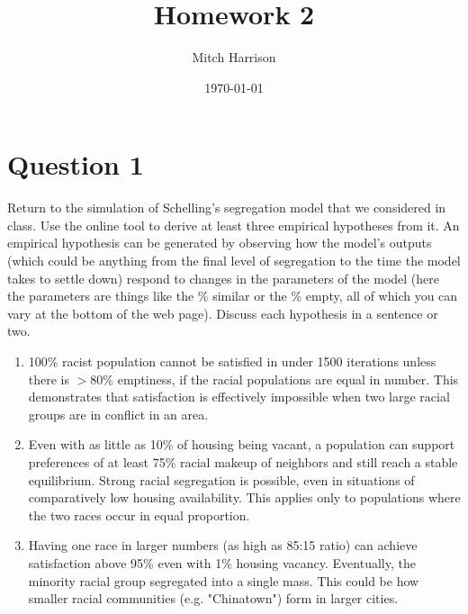 \documentclass[titlepage, 12pt, leqno]{article}
\title{\Huge{Homework 2}}
\author{\large{Mitch Harrison}}
\date{\today}
\begin{document}
\setlength{\parskip}{1\baselineskip}
\setlength{\parindent}{15pt}
\maketitle
\newpage


\section{Question 1}

\begin{ex}
    Return to the simulation of Schelling’s segregation model that we considered 
    in class. Use the online tool to derive at least three empirical hypotheses 
    from it. An empirical hypothesis can be generated by observing how the 
    model’s outputs (which could be anything from the final level of segregation
    to the time the model takes to settle down) respond to changes in the 
    parameters of the model (here the parameters are things like the \% similar
    or the \% empty, all of which you can vary at the bottom of the web
    page). Discuss each hypothesis in a sentence or two.
\end{ex}

\begin{enumerate}
    \item 100\% racist population cannot be satisfied in under 1500 iterations
        unless there is $>80$\% emptiness, if the racial populations are equal in
        number. This demonstrates that satisfaction is effectively impossible when
        two large racial groups are in conflict in an area.
    \item Even with as little as 10\% of housing being vacant, a population can
        support preferences of at least 75\% racial makeup of neighbors and still
        reach a stable equilibrium. Strong racial segregation is possible, even in
        situations of comparatively low housing availability. This applies only
        to populations where the two races occur in equal proportion.
    \item Having one race in larger numbers (as high as 85:15 ratio) can achieve
        satisfaction above 95\% even with 1\% housing vacancy. Eventually, the
        minority racial group segregated into a single mass. This could be how
        smaller racial communities (e.g. "Chinatown") form in larger cities.
\end{enumerate}
\end{document}

